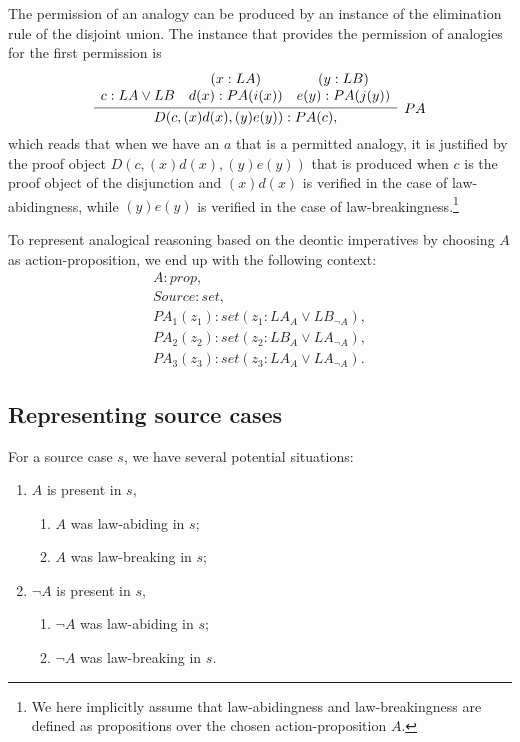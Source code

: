 		The permission of an analogy can be produced by an instance of the elimination rule of the disjoint union. The instance that provides the permission of analogies for the first permission is
			\[
			\infer[PA]{D(c, (x)d(x), (y)e(y)) : PA(c),}{\begin{array}{ccc} & (x : LA) & (y : LB) \\
			c : LA \lor LB & d(x) : PA(i(x)) & e(y) : PA(j(y)) \end{array}}
			\]
		which reads that when we have an $a$ that is a permitted analogy, it is justified by the proof object $D(c, (x)d(x), (y)e(y))$ that is produced when $c$ is the proof object of the disjunction and $(x)d(x)$ is verified in the case of law-abidingness, while $(y)e(y)$ is verified in the case of law-breakingness.\footnote{We here implicitly assume that law-abidingness and law-breakingness are defined as propositions over the chosen action-proposition $A$.}  
		
		To represent analogical reasoning based on the deontic imperatives by choosing $A$ as action-proposition, we end up with the following context:
			\[
			\begin{array}{c}
				A : prop,                                      \\
				Source : set,                                  \\
				PA_1(z_1) : set (z_1 : LA_A \lor LB_{\neg A}), \\
				PA_2(z_2) : set (z_2 : LB_A \lor LA_{\neg A}), \\
				PA_3(z_3) : set (z_3 : LA_A \lor LA_{\neg A}).
			\end{array}
			\]	

	\subsection{Representing source cases}
		
		For a source case $s$, we have several potential situations:
			\begin{samepage}
			\begin{enumerate}
				\item $A$ is present in $s$,
					\begin{enumerate}
						\item $A$ was law-abiding in $s$;
						\item $A$ was law-breaking in $s$;
					\end{enumerate}
				\item  $\neg A$ is present in $s$,
					\begin{enumerate}
						\item $\neg A$ was law-abiding in $s$;
						\item $\neg A$ was law-breaking in $s$.
					\end{enumerate}
			\end{enumerate}	
			\end{samepage}	

